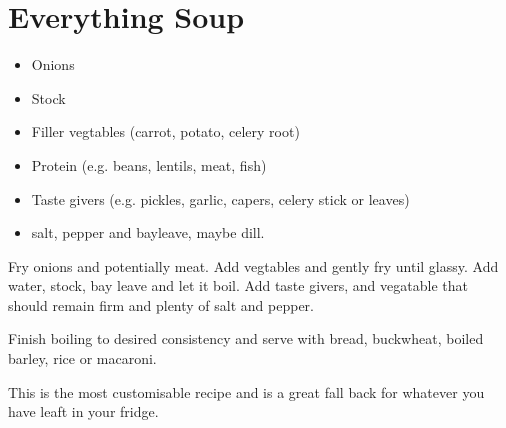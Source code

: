 \section{Everything Soup}{
        \begin{itemize}
                \item Onions
                \item Stock
                \item Filler vegtables (carrot, potato, celery root)
                \item Protein (e.g. beans, lentils, meat, fish)
                \item Taste givers (e.g. pickles, garlic, capers, celery stick
                or leaves)
                \item salt, pepper and bayleave, maybe dill.
        \end{itemize}
        Fry onions and potentially meat. Add vegtables and gently fry until
        glassy. Add water, stock, bay leave and let it boil. Add taste givers, 
        and vegatable that should remain firm and plenty of salt and pepper.
        
        Finish boiling to desired consistency and serve with bread, buckwheat,
        boiled barley, rice or macaroni.

        This is the most customisable recipe and is a great fall back for 
        whatever you have leaft in your fridge.
        }
